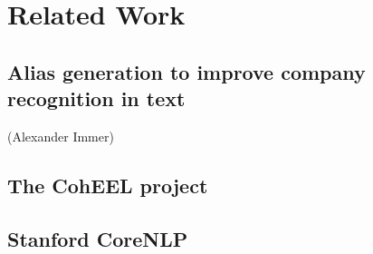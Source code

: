 \section{Related Work}
\label{sec:related_work}
\subsection{Alias generation to improve company recognition in text}
(Alexander Immer)
\subsection{The CohEEL project}
\subsection{Stanford CoreNLP}